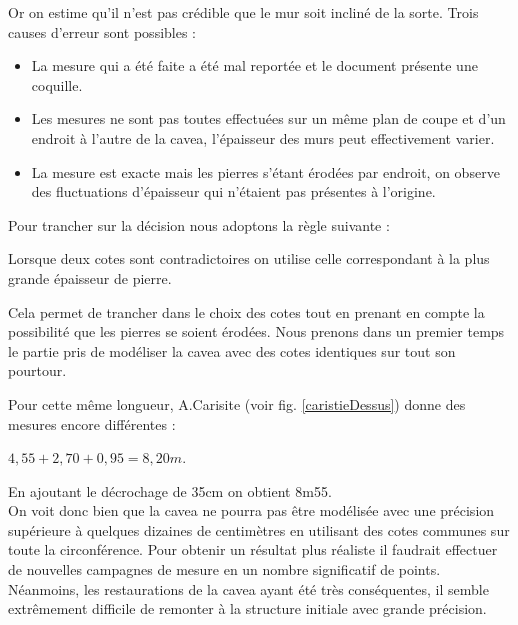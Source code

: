 Or on estime qu'il n'est pas crédible que le mur soit incliné de la sorte. Trois causes d'erreur sont possibles :
\begin{itemize}
	\item La mesure qui a été faite a été mal reportée et le document présente une coquille.
	\item Les mesures ne sont pas toutes effectuées sur un même plan de coupe et d'un endroit à l'autre de la cavea, l'épaisseur des murs peut effectivement varier.
	\item La mesure est exacte mais les pierres s'étant érodées par endroit, on observe des fluctuations d'épaisseur qui n'étaient pas présentes à l'origine.
\end{itemize}

Pour trancher sur la décision nous adoptons la règle suivante :

\begin{theo}\label{epaisseur}
	Lorsque deux cotes sont contradictoires on utilise celle correspondant à la plus grande épaisseur de pierre.
\end{theo}

Cela permet de trancher dans le choix des cotes tout en prenant en compte la possibilité que les pierres se soient érodées. Nous prenons dans un premier temps le partie pris de modéliser la cavea avec des cotes identiques sur tout son pourtour. 

Pour cette même longueur, A.Carisite (voir fig. \ref{caristieDessus}) donne des mesures encore différentes : 
\begin{center}
$4,55+2,70+0,95=8,20m$.
\end{center}
En ajoutant le décrochage de 35cm on obtient 8m55. \\

On voit donc bien que la cavea ne pourra pas être modélisée avec une précision supérieure à quelques dizaines de centimètres en utilisant des cotes communes sur toute la circonférence. Pour obtenir un résultat plus réaliste il faudrait effectuer de nouvelles campagnes de mesure en un nombre significatif de points. Néanmoins, les restaurations de la cavea ayant été très conséquentes, il semble extrêmement difficile de remonter à la structure initiale avec grande précision.

